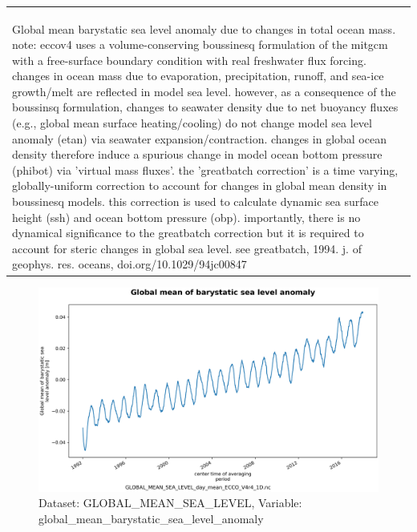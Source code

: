 \begin{longtable}{|m{}|m{}|m{}|m{}|}
{{{{{\hspace*{0.5cm}global\_mean\_barystatic\_sea\_level\_anomaly: valid\_min = -0.045110904\\
}}}}} \\ \hline
\rowcolor{lightgray} \multicolumn{4}{|c|}{\textbf{Comments}} \\ \hline
\multicolumn{4}{|p{1\textwidth}|}{\footnotesize{{Global mean barystatic sea level anomaly due to changes in total ocean mass. note: eccov4 uses a volume-conserving boussinesq formulation of the mitgcm with a free-surface boundary condition with real freshwater flux forcing. changes in ocean mass due to evaporation, precipitation, runoff, and sea-ice growth/melt are reflected in model sea level. however, as a consequence of the boussinsq formulation, changes to seawater density due to net buoyancy fluxes (e.g., global mean surface heating/cooling) do not change model sea level anomaly (etan) via seawater expansion/contraction. changes in global ocean density therefore induce a spurious change in model ocean bottom pressure (phibot) via 'virtual mass fluxes'. the 'greatbatch correction' is a time varying, globally-uniform correction to account for changes in global mean density in boussinesq models. this correction is used to calculate dynamic sea surface height (ssh) and ocean bottom pressure (obp). importantly, there is no dynamical significance to the greatbatch correction but it is required to account for steric changes in global sea level. see greatbatch, 1994. j. of geophys. res. oceans, doi.org/10.1029/94jc00847}}} \\ \hline
\end{longtable}

\begin{figure}[H]
\centering
\includegraphics[scale=0.55]{../images/plots/oneD_plots/Global_Mean_Sea_Level/global_mean_barystatic_sea_level_anomaly.png}
\caption{Dataset: GLOBAL\_MEAN\_SEA\_LEVEL, Variable: global\_mean\_barystatic\_sea\_level\_anomaly}
\label{tab:table-GLOBAL_MEAN_SEA_LEVEL_global_mean_barystatic_sea_level_anomaly-Plot}
\end{figure}
\newpage
\pagebreak
